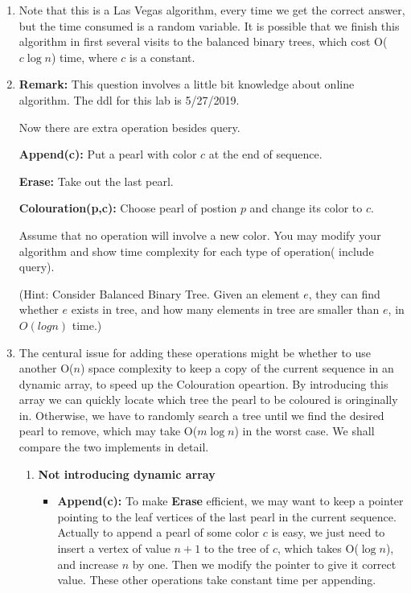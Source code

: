 \documentclass[12pt,a4paper]{article}
\makeatletter
\newtheorem*{solution}{Solution}
\theoremstyle{definition}
\renewenvironment{solution}[1][Solution] {\par\pushQED{\qed}\normalfont\topsep6\p@\@plus6\p@\relax\trivlist\item[\hskip\labelsep\bfseries#1\@addpunct{.}]\ignorespaces}{\popQED\endtrivlist\@endpefalse} \makeatother
\makeatother
\begin{document}
\begin{enumerate}
\begin{enumerate}
\begin{solution}
  Note that this is a Las Vegas algorithm, every time we get the correct answer, but the time consumed is a random variable. It is possible that we finish this algorithm in first several visits to the balanced binary trees, which cost O($c\log n$) time, where $c$ is a constant.
\end{solution}
\item \textbf{Remark:} This question involves a little bit knowledge about online algorithm. The ddl for this lab is 5/27/2019. \par
Now there are extra operation besides query.\par
\textbf{Append(c):} Put a pearl with color $c$ at the end of sequence.\par
\textbf{Erase:} Take out the last pearl.\par
\textbf{Colouration(p,c):} Choose pearl of postion $p$ and change its color to $c$.\par
Assume that no operation will involve a new color. You may modify your algorithm and show time complexity for each type of operation( include query).\par  
\color{blue}(Hint: Consider Balanced Binary Tree. Given an element $e$, they can find whether $e$ exists in tree, and how many elements in tree are smaller than $e$, in $O(logn)$ time.)\color{black}
\begin{solution}
  The centural issue for adding these operations might be whether to use another O($n$) space complexity to keep a copy of the current sequence in an dynamic array, to speed up the Colouration opeartion. By introducing this array we can quickly locate which tree the pearl to be coloured is oringinally in. Otherwise, we have to randomly search a tree until we find the desired pearl to remove, which may take O($m\log n$) in the worst case. We shall compare the two implements in detail.
  \begin{enumerate}
    \item \textbf{Not introducing dynamic array}
    \begin{itemize}
      \item \textbf{Append(c):} To make \textbf{Erase} efficient, we may want to keep a pointer pointing to the leaf vertices of the last pearl in the current sequence. Actually to append a pearl of some color $c$ is easy, we just need to insert a vertex of value $n+1$ to the tree of $c$, which takes O($\log n$), and increase $n$ by one. Then we modify the pointer to give it correct value. These other operations take constant time per appending.

\end{itemize}
\end{enumerate}
\end{solution}
\end{enumerate}
\end{enumerate}
\end{document}
